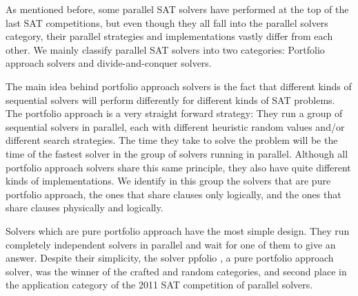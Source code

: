 \documentclass[12pt]{diicc}
\begin{document}
As mentioned before, some parallel SAT solvers have performed at the top of the last SAT competitions, but even though they all fall into the parallel solvers category, their parallel strategies and implementations vastly differ from each other. We mainly classify parallel SAT solvers into two categories: Portfolio approach solvers and divide-and-conquer solvers.

The main idea behind portfolio approach solvers is the fact that different kinds of sequential solvers will perform differently for different kinds of SAT problems. The portfolio approach is a very straight forward strategy: They run a group of sequential solvers in parallel, each with different heuristic random values and/or different search strategies. The time they take to solve the problem will be the time of the fastest solver in the group of solvers running in parallel. Although all portfolio approach solvers share this same principle, they also have quite different kinds of implementations. We identify in this group the solvers that are pure portfolio approach, the ones that share clauses only logically, and the ones that share clauses physically and logically.

Solvers which are pure portfolio approach have the most simple design. They run completely independent solvers in parallel and wait for one of them to give an answer. Despite their simplicity, the solver ppfolio \cite{ppfolio}, a pure portfolio approach solver, was the winner of the crafted and random categories, and second place in the application category of the 2011 SAT competition of parallel solvers. 
\end{document}
